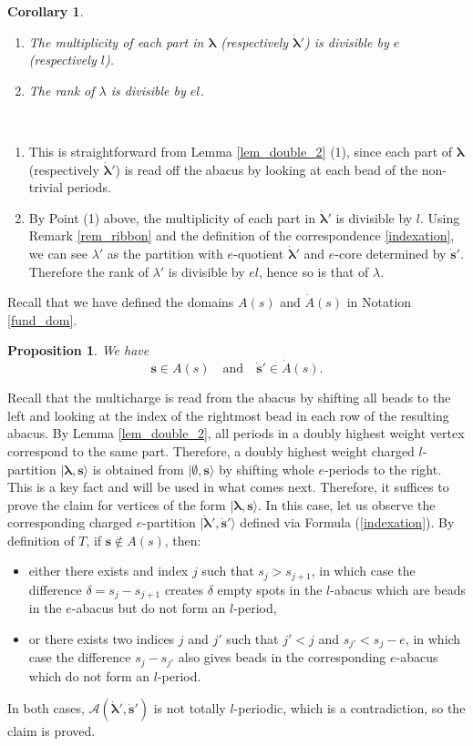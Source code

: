 \documentclass[twoside,12pt]{amsart}
\theoremstyle{plain}
\newcommand{\cA}{\mathcal{A}}
\newcommand{\bs}{\mathbf{s}}
\newcommand{\la}{\lambda}
\newcommand{\de}{\delta}
\newcommand{\bla}{\boldsymbol{\la}}
\newcommand{\dA}{\dot{A}}
\newcommand{\dbs}{\dot{\bs}}
\newcommand{\dbla}{\dot{\bla}}
\newcommand{\mand}{\quad\text{and}\quad}
\newcommand{\bemp}{\boldsymbol{\emptyset}}
\newtheorem{prop}[num]{Proposition}
\newtheorem{cor}[num]{Corollary}
\theoremstyle{remark}
\begin{document}
\begin{cor}\label{cor_double_3}\
\begin{enumerate}
\item The multiplicity of each part in $\bla$ (respectively $\dbla'$) is divisible by $e$ (respectively $l$).
\item The rank of $\la$ is divisible by $el$.
\end{enumerate}
\end{cor}

\proof \
\begin{enumerate}
\item This is straightforward from Lemma \ref{lem_double_2} (1), since
each part of $\bla$ (respectively $\dbla'$)
is read off the abacus by looking at each bead of the non-trivial periods.
\item By Point (1) above, the multiplicity of each part in $\dbla'$ is divisible by $l$.
Using Remark \ref{rem_ribbon} and the definition of the correspondence \ref{indexation}, 
we can see $\la'$ as the partition with $e$-quotient $\dbla'$ and $e$-core determined by $\dbs'$.
Therefore the rank of $\la'$ is divisible by $el$, hence so is that of $\la$.
\end{enumerate}
\endproof


Recall that we have defined the domains $A(s)$ and $\dA(s)$ in Notation \ref{fund_dom}.

\begin{prop}\label{prop_charge}
We have
$$ \bs\in A(s) \mand
\dbs'\in \dA(s).
$$
\end{prop}

\proof
Recall that the multicharge is read from the abacus by
shifting all beads to the left and looking at the index of the rightmost bead in each row
of the resulting abacus.
By Lemma \ref{lem_double_2}, all periods in a doubly highest weight vertex correspond to the same part.
Therefore, a doubly highest weight charged $l$-partition $|\bla,\bs\rangle$  is obtained from 
$|\bemp,\bs\rangle$ by shifting whole $e$-periods to the right.
This is a key fact and will be used in what comes next.
Therefore, it suffices to prove the claim for vertices of the form $|\bla,\bs\rangle$.
In this case,
let us observe the corresponding charged $e$-partition $|\dbla',\dbs'\rangle$ defined via Formula (\ref{indexation}).
By definition of $T$, if $\bs\notin A(s)$, then: 
\begin{itemize}
\item either there exists and index $j$ such that $s_j>s_{j+1}$, in which case the difference $\de=s_j-s_{j+1}$
creates $\de$ empty spots in the $l$-abacus which are beads in the $e$-abacus but do not form an $l$-period,
\item or there exists two indices $j$ and $j'$ such that $j'<j$ and $s_{j'}<s_j-e$, in which case
the difference $s_j-s_{j'}$ also gives beads in the corresponding $e$-abacus which do not form an $l$-period.
\end{itemize}
In both cases, $\cA(\dbla',\dbs')$ is not totally $l$-periodic, which is a contradiction, so the claim is proved.
\endproof
\end{document}
